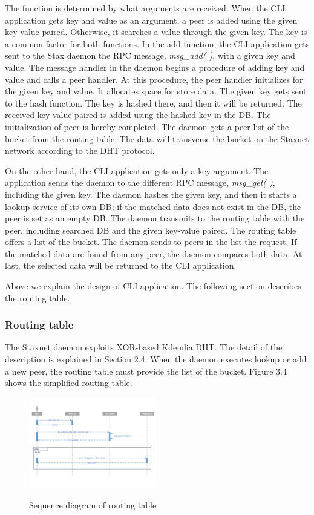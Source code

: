 The function is determined by what arguments are received. When the CLI application gets key and value as an argument, a peer is added using the given key-value paired. Otherwise, it searches a value through the given key. The key is a common factor for both functions. In the add function, the CLI application gets sent to the Stax daemon the RPC message, \textit{msg\_add( )}, with a given key and value. The message handler in the daemon begins a procedure of adding key and value and calls a peer handler. At this procedure, the peer handler initializes for the given key and value. It allocates space for store data. The given key gets sent to the hash function. The key is hashed there, and then it will be returned. The received key-value paired is added using the hashed key in the DB. The initialization of peer is hereby completed. The daemon gets a peer list of the bucket from the routing table. The data will transverse the bucket on the Staxnet network according to the DHT protocol.

On the other hand, the CLI application gets only a key argument. The application sends the daemon to the different RPC message, \textit{msg\_get( )}, including the given key. The daemon hashes the given key, and then it starts a lookup service of its own DB; if the matched data does not exist in the DB, the peer is set as an empty DB. The daemon transmits to the routing table with the peer, including searched DB and the given key-value paired. The routing table offers a list of the bucket. The daemon sends to peers in the list the request. If the matched data are found from any peer, the daemon compares both data. At last, the selected data will be returned to the CLI application.

Above we explain the design of CLI application. The following section describes the routing table.

\subsubsection{Routing table}

The Staxnet daemon exploits XOR-based Kdemlia DHT. The detail of the description is explained in Section 2.4. When the daemon executes lookup or add a new peer, the routing table must provide the list of the bucket. Figure 3.4 shows the simplified routing table.

\begin{figure}[!ht]
	\centering
	\includegraphics[width=0.5\textwidth]{images/seq3_4.pdf}\\
	\caption{Sequence diagram of routing table}
	\label{fig:routing table}
\end{figure}

